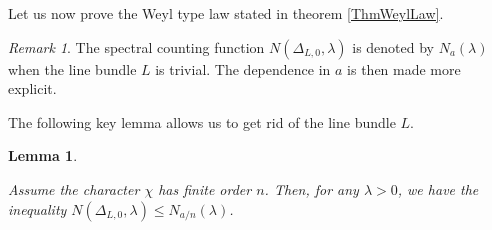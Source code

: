 \documentclass{jams-l}
\newtheorem{lemma}[theorem]{Lemma}
\theoremstyle{definition}
\theoremstyle{remark}
\newtheorem{remark}[theorem]{Remark}
\numberwithin{equation}{section}
\begin{document}
        Let us now prove the Weyl type law stated in theorem \ref{ThmWeylLaw}.
        
        \begin{remark}
        
            The spectral counting function $N \left( \Delta_{L,0}, \lambda \right)$ is denoted by $N_a \left( \lambda \right)$ when the line bundle $L$ is trivial. The dependence in $a$ is then made more explicit.
        
        \end{remark}
        
        
        
        \noindent The following key lemma allows us to get rid of the line bundle $L$.
        
        \begin{lemma}
        \label{LemmaSpectralCountingLineBundle}
        
            Assume the character $\chi$ has finite order $n$. Then, for any $\lambda > 0$, we have the inequality $N \left( \Delta_{L,0}, \lambda \right) \leqslant N_{a/n} \left( \lambda \right)$.
        
        \end{lemma}
        
\end{document}
